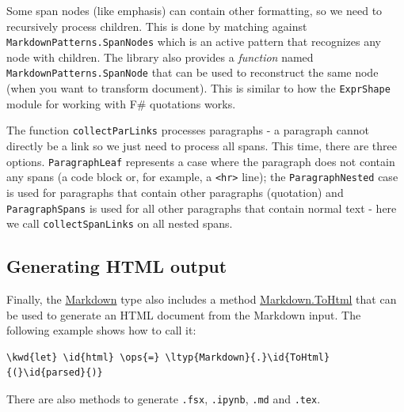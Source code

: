 \documentclass{article}
\newcommand{\id}[1]{\textcolor{black}{#1}}
\newcommand{\kwd}[1]{\textcolor{navy}{#1}}
\newcommand{\ops}[1]{\textcolor{purple}{#1}}
\begin{document}
Some span nodes (like emphasis) can contain other formatting, so we need to recursively
process children. This is done by matching against \texttt{MarkdownPatterns.SpanNodes} which is an active
pattern that recognizes any node with children. The library also provides a \emph{function}
named \texttt{MarkdownPatterns.SpanNode} that can be used to reconstruct the same node (when you want
to transform document). This is similar to how the \texttt{ExprShape} module for working with
F\# quotations works.


The function \texttt{collectParLinks} processes paragraphs - a paragraph cannot directly be a
link so we just need to process all spans. This time, there are three options.
\texttt{ParagraphLeaf} represents a case where the paragraph does not contain any spans
(a code block or, for example, a \texttt{<hr>} line); the \texttt{ParagraphNested} case is used for paragraphs
that contain other paragraphs (quotation) and \texttt{ParagraphSpans} is used for all other
paragraphs that contain normal text - here we call \texttt{collectSpanLinks} on all nested spans.
\subsection*{Generating HTML output}



Finally, the \href{https://fsprojects.github.io/FSharp.Formatting/reference/fsharp-formatting-markdown-markdown.html}{Markdown} type also includes a method \href{https://fsprojects.github.io/FSharp.Formatting/reference/fsharp-formatting-markdown-markdown.html}{Markdown.ToHtml} that can be used
to generate an HTML document from the Markdown input. The following example shows how to call it:
\begin{Verbatim}[commandchars=\\\{\}]
\kwd{let} \id{html} \ops{=} \ltyp{Markdown}{.}\id{ToHtml}{(}\id{parsed}{)}
\end{Verbatim}



There are also methods to generate \texttt{.fsx}, \texttt{.ipynb}, \texttt{.md} and \texttt{.tex}.
\end{document}
